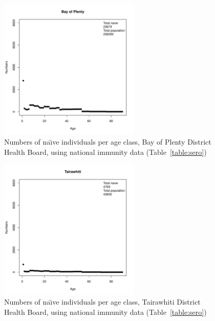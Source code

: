 \documentclass{article}
\begin{document}
\begin{figure}[H]
     \begin{center}
     \includegraphics[width=0.6\textwidth]{dhb7.pdf}
     \end{center}
     \caption{Numbers of na\"{\i}ve individuals per age class, Bay of Plenty District Health Board, using national immunity data (Table~\autoref{table:sero})}
     \label{fig:BayofPlenty}
\end{figure}

\begin{figure}[H]
     \begin{center}
     \includegraphics[width=0.6\textwidth]{dhb8.pdf}
     \end{center}
     \caption{Numbers of na\"{\i}ve individuals per age class, Tairawhiti District Health Board, using national immunity data (Table~\autoref{table:sero})}
     \label{fig:Tairawhiti}
\end{figure}
\end{document}
